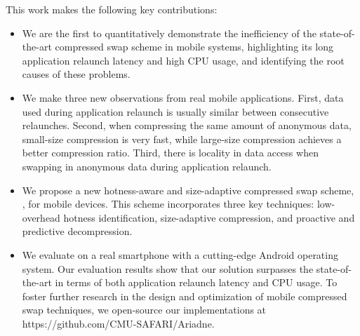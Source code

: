 This work makes the following key contributions:
\begin{itemize}
    \item We are the first to quantitatively demonstrate the inefficiency of the state-of-the-art compressed swap scheme in mobile systems, highlighting its long application relaunch latency and high CPU usage, and identifying the root causes of these problems.  
    \item We make three new observations from real mobile applications. First, data used during application relaunch is usually similar between consecutive relaunches. Second, when compressing the same amount of anonymous data, small-size compression is very fast, while large-size compression achieves a better compression ratio. Third, there is locality in data access when swapping in anonymous data during application relaunch.
    \item We propose a new hotness-aware and size-adaptive compressed swap scheme, \proposal, for mobile devices. This scheme incorporates three key techniques: low-overhead hotness identification, size-adaptive compression, and proactive and predictive decompression.
    \item We evaluate \proposal on a real smartphone with a cutting-edge Android operating system. Our evaluation results show that our solution surpasses the state-of-the-art in terms of both application relaunch latency and CPU usage. To foster further research in the design and optimization of mobile compressed swap techniques, we open-source our implementations at https://github.com/CMU-SAFARI/Ariadne.
\end{itemize}






